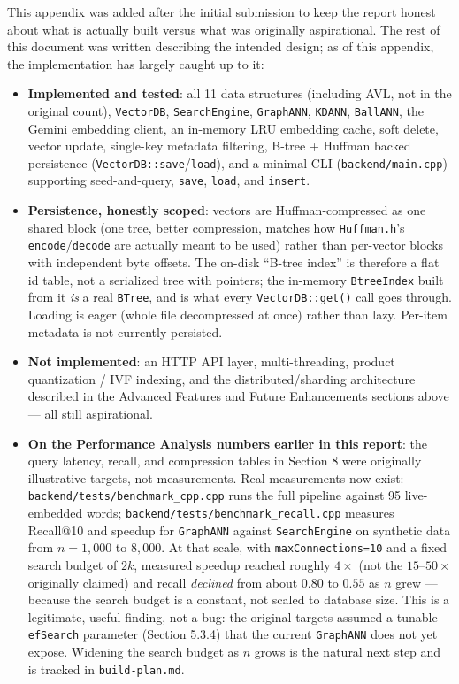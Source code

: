 \documentclass[12pt,a4paper]{article}
\begin{document}
This appendix was added after the initial submission to keep the report honest about what is actually built versus what was originally aspirational. The rest of this document was written describing the intended design; as of this appendix, the implementation has largely caught up to it:

\begin{itemize}
    \item \textbf{Implemented and tested}: all 11 data structures (including AVL, not in the original count), \texttt{VectorDB}, \texttt{SearchEngine}, \texttt{GraphANN}, \texttt{KDANN}, \texttt{BallANN}, the Gemini embedding client, an in-memory LRU embedding cache, soft delete, vector update, single-key metadata filtering, B-tree + Huffman backed persistence (\texttt{VectorDB::save}/\texttt{load}), and a minimal CLI (\texttt{backend/main.cpp}) supporting seed-and-query, \texttt{save}, \texttt{load}, and \texttt{insert}.
    \item \textbf{Persistence, honestly scoped}: vectors are Huffman-compressed as one shared block (one tree, better compression, matches how \texttt{Huffman.h}'s \texttt{encode}/\texttt{decode} are actually meant to be used) rather than per-vector blocks with independent byte offsets. The on-disk ``B-tree index'' is therefore a flat id table, not a serialized tree with pointers; the in-memory \texttt{BtreeIndex} built from it \emph{is} a real \texttt{BTree}, and is what every \texttt{VectorDB::get()} call goes through. Loading is eager (whole file decompressed at once) rather than lazy. Per-item metadata is not currently persisted.
    \item \textbf{Not implemented}: an HTTP API layer, multi-threading, product quantization / IVF indexing, and the distributed/sharding architecture described in the Advanced Features and Future Enhancements sections above — all still aspirational.
    \item \textbf{On the Performance Analysis numbers earlier in this report}: the query latency, recall, and compression tables in Section 8 were originally illustrative targets, not measurements. Real measurements now exist: \texttt{backend/tests/benchmark\_cpp.cpp} runs the full pipeline against 95 live-embedded words; \texttt{backend/tests/benchmark\_recall.cpp} measures Recall@10 and speedup for \texttt{GraphANN} against \texttt{SearchEngine} on synthetic data from $n=1{,}000$ to $8{,}000$. At that scale, with \texttt{maxConnections=10} and a fixed search budget of $2k$, measured speedup reached roughly $4\times$ (not the $15$--$50\times$ originally claimed) and recall \emph{declined} from about $0.80$ to $0.55$ as $n$ grew — because the search budget is a constant, not scaled to database size. This is a legitimate, useful finding, not a bug: the original targets assumed a tunable \texttt{efSearch} parameter (Section 5.3.4) that the current \texttt{GraphANN} does not yet expose. Widening the search budget as $n$ grows is the natural next step and is tracked in \texttt{build-plan.md}.
\end{itemize}
\end{document}
